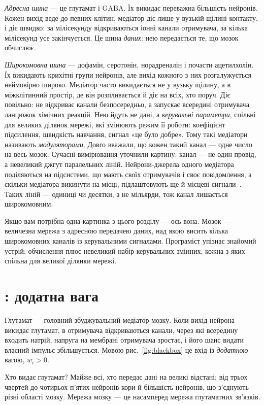 \emph{Адресна шина} --- це глутамат і GABA. Їх викидає переважна більшість нейронів. Кожен вихід веде до певних клітин, медіатор діє лише у вузькій щілині контакту, і діє швидко: за мілісекунду відкриваються іонні канали отримувача, за кілька мілісекунд усе закінчується. Це шина \emph{даних}: нею передається те, що мозок обчислює.

\emph{Широкомовна шина} --- дофамін, серотонін, норадреналін і почасти ацетилхолін. Їх викидають крихітні групи нейронів, але вихід кожного з них розгалужується неймовірно широко. Медіатор часто викидається не у вузьку щілину, а в міжклітинний простір, де він розпливається й діє на всіх, хто поруч. Діє повільно: не відкриває канали безпосередньо, а запускає всередині отримувача ланцюжок хімічних реакцій. Нею йдуть не дані, а \emph{керувальні параметри}, спільні для великих ділянок мережі, які змінюють режим її роботи: коефіцієнт підсилення, швидкість навчання, сигнал «це було добре». Тому такі медіатори називають \emph{модуляторами}. Довго вважали, що кожен такий канал --- одне число на весь мозок. Сучасні вимірювання уточнили картину: канал --- не один провід, а невеликий джгут паралельних ліній. Нейрони-джерела одного медіатора поділяються на підсистеми, що мають своїх отримувачів і своє повідомлення, а скільки медіатора викинути на місці, підлаштовують ще й місцеві сигнали~\cite{Ren2018,Poe2020}. Таких ліній --- одиниці чи десятки, а не мільярди, тож канал лишається широкомовним.

Якщо вам потрібна одна картинка з цього розділу --- ось вона. Мозок --- величезна мережа з адресною передачею даних, над якою висить кілька широкомовних каналів із керувальними сигналами. Програміст упізнає знайомий устрій: обчислення плюс невеликий набір керувальних змінних, кожна з яких спільна для великої ділянки мережі.

\section{: додатна вага}

Глутамат --- головний збуджувальний медіатор мозку. Коли вихід нейрона викидає глутамат, в отримувача відкриваються канали, через які всередину входить натрій, напруга на мембрані отримувача зростає, і його шанс видати власний імпульс збільшується. Мовою рис.~\ref{fig:blackbox} це вхід із \emph{додатною} вагою, $w_i>0$.

Хто видає глутамат? Майже всі, хто передає дані на великі відстані: від трьох чвертей до чотирьох п'ятих нейронів кори й більшість нейронів, що з'єднують різні області мозку. Мережа мозку --- це насамперед мережа глутаматних зв'язків.

